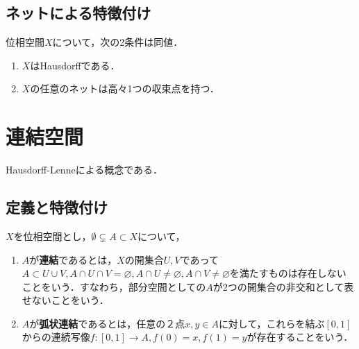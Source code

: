 \documentclass[uplatex,dvipdfmx]{jsreport}
\begin{document}
\subsection{ネットによる特徴付け}

\begin{proposition}
    位相空間$X$について，次の2条件は同値．
    \begin{enumerate}
        \item $X$はHausdorffである．
        \item $X$の任意のネットは高々1つの収束点を持つ．
    \end{enumerate}
\end{proposition}

\section{連結空間}

\begin{tcolorbox}[colframe=ForestGreen, colback=ForestGreen!10!white,breakable,colbacktitle=ForestGreen!40!white,coltitle=black,fonttitle=\bfseries\sffamily,
title=]
    Hausdorff-Lenneによる概念である．
\end{tcolorbox}

\subsection{定義と特徴付け}

\begin{definition}[connected]\label{def-連結性}
    $X$を位相空間とし，$\emptyset\subsetneq A\subset X$について，
    \begin{enumerate}
        \item $A$が\textbf{連結}であるとは，$X$の開集合$U,V$であって$A\subset U\cup V,A\cap U\cap V=\varnothing, A\cap U\ne\varnothing, A\cap V\ne\varnothing$を満たすものは存在しないことをいう．すなわち，部分空間としての$A$が2つの開集合の非交和として表せないことをいう．
        \item $A$が\textbf{弧状連結}であるとは，任意の２点$x,y\in A$に対して，これらを結ぶ$[0,1]$からの連続写像$f:[0,1]\to A, f(0)=x, f(1)=y$が存在することをいう．
    \end{enumerate}
\end{definition}
\end{document}
